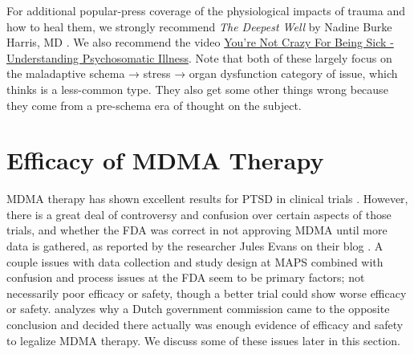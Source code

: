 \documentclass[12pt,letterpaper]{book}
\begin{document}
For additional popular-press coverage of the physiological impacts of trauma and how to heal them, we strongly recommend \textit{The Deepest Well} by Nadine Burke Harris, MD \cite{harris2018deepest}. We also recommend the video \href{https://www.youtube.com/watch?v=oHoFqwF2OAU}{You're Not Crazy For Being Sick - Understanding Psychosomatic Illness}. Note that both of these largely focus on the maladaptive schema → stress → organ dysfunction category of issue, which \textcite{berghPsychogenic} thinks is a less-common type. They also get some other things wrong because they come from a pre-schema era of thought on the subject.
\section{Efficacy of MDMA Therapy}
MDMA therapy has shown excellent results for PTSD in clinical trials \cite{mitchellMDMAClinicalTrial,mitchellMDMAClinicalTrial2}. However, there is a great deal of controversy and confusion over certain aspects of those trials, and whether the FDA was correct in not approving MDMA until more data is gathered, as reported by the researcher Jules Evans on their blog \textcite{evansBlame}. A couple issues with data collection and study design at MAPS combined with confusion and process issues at the FDA seem to be primary factors; not necessarily poor efficacy or safety, though a better trial could show worse efficacy or safety. \textcite{fdaVSdutch} analyzes why a Dutch government commission came to the opposite conclusion and decided there actually was enough evidence of efficacy and safety to legalize MDMA therapy. We discuss some of these issues later in this section.
\end{document}
